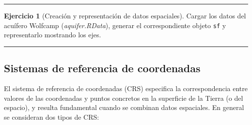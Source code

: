 \documentclass[
  spanish,
]{book}
\theoremstyle{break}
\theoremstyle{definition}
\theoremstyle{definition}
\theoremstyle{definition}
\newtheorem{exercise}{Ejercicio}[chapter]
\theoremstyle{definition}
\theoremstyle{remark}
\begin{document}
\begin{center}\rule{0.5\linewidth}{0.5pt}\end{center}

\begin{exercise}[Creación y representación de datos espaciales]
\protect\hypertarget{exr:aquifer1}{}{\label{exr:aquifer1} {} }Cargar los datos del acuífero Wolfcamp (\emph{aquifer.RData}), generar el correspondiente
objeto \texttt{sf} y representarlo mostrando los ejes.
\end{exercise}

\begin{center}\rule{0.5\linewidth}{0.5pt}\end{center}

\hypertarget{crs}{%
\subsection{Sistemas de referencia de coordenadas}\label{crs}}

El sistema de referencia de coordenadas (CRS) especifica la correspondencia entre valores de las coordenadas y puntos concretos en la superficie de la Tierra (o del espacio), y resulta fundamental cuando se combinan datos espaciales.
En general se consideran dos tipos de CRS:
\end{document}
